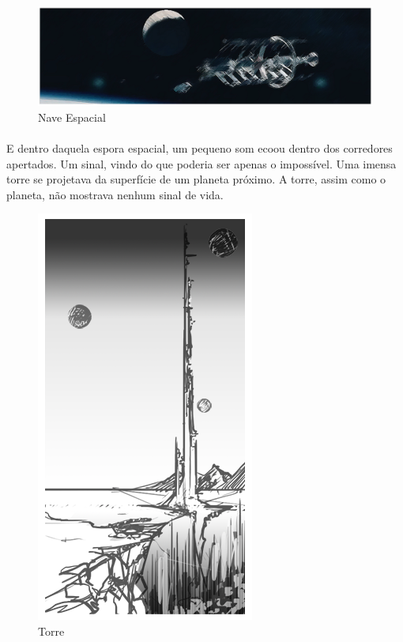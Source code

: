 \documentclass[11pt]{article} %
\begin{document}
\begin{figure}[!htp]
\centering
\includegraphics[scale=0.3]{res/history.png}
\caption{Nave Espacial}
\label{Nave Espacial}
\end{figure}

\paragraph{}E dentro daquela espora espacial, um pequeno som ecoou dentro dos corredores apertados. Um sinal, vindo do que poderia ser apenas o impossível. Uma imensa torre se projetava da superfície de um planeta próximo. A torre, assim como o planeta, não mostrava nenhum sinal de vida.

\newpage

\begin{figure}[!htp]
\centering
\includegraphics[scale=0.4]{res/tower.png}
\caption{Torre}
\label{Torre}
\end{figure}
\end{document}
